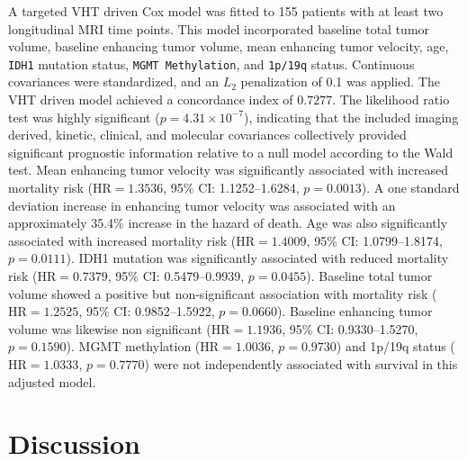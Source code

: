 A targeted VHT driven Cox model was fitted to 155 patients with at least two longitudinal MRI time points. This model incorporated baseline total tumor volume, baseline enhancing tumor volume, mean enhancing tumor velocity, age, \texttt{IDH1} mutation status, \texttt{MGMT Methylation}, and \texttt{1p/19q} status. Continuous covariances were standardized, and an $L_2$ penalization of 0.1 was applied. The VHT driven model achieved a concordance index of $0.7277$. The likelihood ratio test was highly significant ($p = 4.31 \times 10^{-7}$), indicating that the included imaging derived, kinetic, clinical, and molecular covariances collectively provided significant prognostic information relative to a null model according to the Wald test. Mean enhancing tumor velocity was significantly associated with increased mortality risk ($\text{HR} = 1.3536$, 95\% CI: 1.1252--1.6284, $p = 0.0013$). A one standard deviation increase in enhancing tumor velocity was associated with an approximately 35.4\% increase in the hazard of death. Age was also significantly associated with increased mortality risk ($\text{HR} = 1.4009$, 95\% CI: 1.0799--1.8174, $p = 0.0111$). IDH1 mutation was significantly associated with reduced mortality risk ($\text{HR} = 0.7379$, 95\% CI: 0.5479--0.9939, $p = 0.0455$). Baseline total tumor volume showed a positive but non-significant association with mortality risk ($\text{HR} = 1.2525$, 95\% CI: 0.9852--1.5922, $p = 0.0660$). Baseline enhancing tumor volume was likewise non significant ($\text{HR} = 1.1936$, 95\% CI: 0.9330--1.5270, $p = 0.1590$). MGMT methylation ($\text{HR} = 1.0036$, $p = 0.9730$) and 1p/19q status ($\text{HR} = 1.0333$, $p = 0.7770$) were not independently associated with survival in this adjusted model.





\newpage

\section{Discussion}


